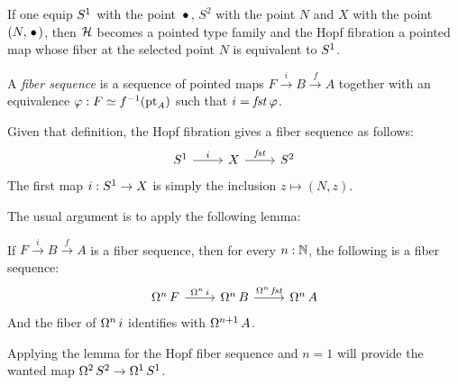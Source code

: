 \documentclass[english,a4]{article}
\newcommand{\Sp}{{S^2}}%
\begin{document}
If one equip ${S^1}$ with the point $\base$, $\Sp$ with the point $N$
and $X$ with the point $(N,\base)$, then $\mathcal H$ becomes a pointed
type family and the Hopf fibration a pointed map whose fiber at the
selected point $N$ is equivalent to ${S^1}$.
\begin{definition}
  A {\em fiber sequence} is a sequence of pointed maps
  $F \overset i \to B \overset f \to A$ together with an equivalence
  $\varphi : F \simeq {f}^{-1}({\mathord{\mathrm{pt}}}_A)$ such that $i = \mathop{\mathit{fst}} \varphi$.
\end{definition}
Given that definition, the Hopf fibration gives a fiber sequence as
follows:
\begin{equation}
  \label{eq:9}
  \begin{tikzcd}
    \Sc \rar["i"] & X \rar["\fst"] & \Sp
  \end{tikzcd}
\end{equation}
The first map $i:{S^1} \to X$ is simply the inclusion $z\mapsto
(N,z)$.

The usual argument is to apply the following lemma:
\begin{lemma}
  \label{lemma:fiber-seq-omega}%
  If $F\overset i \to B \overset f \to A$ is a fiber sequence, then
  for every $n:\mathbb{N}$, the following is a fiber sequence:
  \begin{equation}
    \label{eq:20}
    \begin{tikzcd}
      \loopspace n F \rar["\loopspace n i"] & \loopspace n B
      \rar["\loopspace n \fst"] & \loopspace n A
    \end{tikzcd}    
  \end{equation}
  And the fiber of $\mathop{\Omega^{n}} i$ identifies with
  $\mathop{\Omega^{n+1}} A$.
\end{lemma}
Applying the lemma for the Hopf fiber sequence and $n=1$ will provide
the wanted map $\loopspace 2 \Sp \to \loopspace 1 \Sc$.
\end{document}
